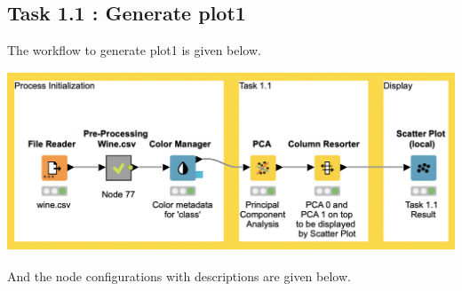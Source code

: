 \documentclass[11pt]{article}
\begin{document}
		\subsection*{Task 1.1 : Generate plot1}
			The workflow to generate plot1 is given below.
			\iftrue
			\begin{center}
				\includegraphics[scale=0.5]{res/t1/t11/t11-workflow}
			\end{center}
			\fi
			And the node configurations with descriptions are given below.
			\iftrue
\end{document}
